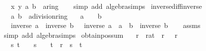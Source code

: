 \begin{isabellebody}
\ \ \ x\ y\ a\ b\ {\isacharcolon}{\kern0pt}{\isacharcolon}{\kern0pt}\ {\isachardoublequoteopen}{\isacharprime}{\kern0pt}a{\isacharcolon}{\kern0pt}{\isacharcolon}{\kern0pt}ring{\isachardoublequoteclose}\isanewline
%
\isadelimproof
\ \ %
\endisadelimproof
%
\isatagproof
{}\isamarkupfalse%
\ {\isacharparenleft}{\kern0pt}simp\ add{\isacharcolon}{\kern0pt}\ algebra{\isacharunderscore}{\kern0pt}simps{\isacharparenright}{\kern0pt}%
\endisatagproof
{\isafoldproof}%
%
\isadelimproof
\isanewline
%
\endisadelimproof
\isanewline
{}\isamarkupfalse%
\ inverse{\isacharunderscore}{\kern0pt}diff{\isacharunderscore}{\kern0pt}inverse{\isacharcolon}{\kern0pt}\isanewline
\ \ \ a\ b\ {\isacharcolon}{\kern0pt}{\isacharcolon}{\kern0pt}\ {\isachardoublequoteopen}{\isacharprime}{\kern0pt}a{\isacharcolon}{\kern0pt}{\isacharcolon}{\kern0pt}division{\isacharunderscore}{\kern0pt}ring{\isachardoublequoteclose}\isanewline
\ \ \ {\isachardoublequoteopen}a\ {\isasymnoteq}\ {}{\isachardoublequoteclose}\ \ {\isachardoublequoteopen}b\ {\isasymnoteq}\ {}{\isachardoublequoteclose}\isanewline
\ \ \ {\isachardoublequoteopen}inverse\ a\ {\isacharminus}{\kern0pt}\ inverse\ b\ {\isacharequal}{\kern0pt}\ {\isacharminus}{\kern0pt}\ {\isacharparenleft}{\kern0pt}inverse\ a\ {\isacharasterisk}{\kern0pt}\ {\isacharparenleft}{\kern0pt}a\ {\isacharminus}{\kern0pt}\ b{\isacharparenright}{\kern0pt}\ {\isacharasterisk}{\kern0pt}\ inverse\ b{\isacharparenright}{\kern0pt}{\isachardoublequoteclose}\isanewline
%
\isadelimproof
\ \ %
\endisadelimproof
%
\isatagproof
{}\isamarkupfalse%
\ assms\ \isamarkupfalse%
\ {\isacharparenleft}{\kern0pt}simp\ add{\isacharcolon}{\kern0pt}\ algebra{\isacharunderscore}{\kern0pt}simps{\isacharparenright}{\kern0pt}%
\endisatagproof
{\isafoldproof}%
%
\isadelimproof
\isanewline
%
\endisadelimproof
\isanewline
{}\isamarkupfalse%
\ obtain{\isacharunderscore}{\kern0pt}pos{\isacharunderscore}{\kern0pt}sum{\isacharcolon}{\kern0pt}\isanewline
\ \ \ r\ {\isacharcolon}{\kern0pt}{\isacharcolon}{\kern0pt}\ rat\ \ r{\isacharcolon}{\kern0pt}\ {\isachardoublequoteopen}{}\ {\isacharless}{\kern0pt}\ r{\isachardoublequoteclose}\isanewline
\ \ \ s\ t\ \ {\isachardoublequoteopen}{}\ {\isacharless}{\kern0pt}\ s{\isachardoublequoteclose}\ \ {\isachardoublequoteopen}{}\ {\isacharless}{\kern0pt}\ t{\isachardoublequoteclose}\ \ {\isachardoublequoteopen}r\ {\isacharequal}{\kern0pt}\ s\ {\isacharplus}{\kern0pt}\ t{\isachardoublequoteclose}\isanewline

\end{isabellebody}
